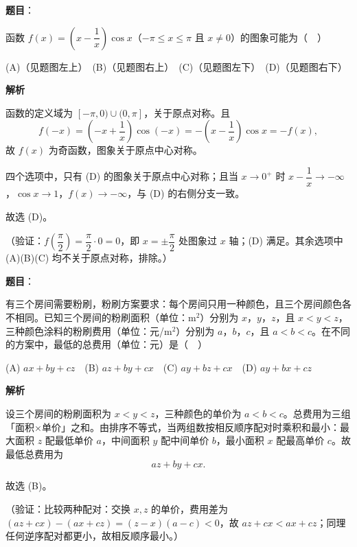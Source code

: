 \begin{answer}

\textbf{题目}：

函数 \(f(x)=\left(x-\dfrac{1}{x}\right)\cos x\)（\(-\pi\leqslant x\leqslant\pi\) 且 \(x\neq0\)）的图象可能为（　）
\nopagebreak[4]
\begin{center}\end{center}
\nopagebreak[4]
(A)（见题图左上）　(B)（见题图右上）　(C)（见题图左下）　(D)（见题图右下）

\textbf{解析}

函数的定义域为 \([-\pi,0)\cup(0,\pi]\)，关于原点对称。且
\nopagebreak[4]
\[
f(-x)=\left(-x+\frac1x\right)\cos(-x)
=-\left(x-\frac1x\right)\cos x=-f(x),
\]
故 \(f(x)\) 为奇函数，图象关于原点中心对称。

四个选项中，只有 (D) 的图象关于原点中心对称；且当 \(x\to0^+\) 时 \(x-\dfrac1x\to-\infty\)，\(\cos x\to1\)，\(f(x)\to-\infty\)，与 (D) 的右侧分支一致。

故选 (D)。

（验证：\(f\left(\dfrac{\pi}{2}\right)=\dfrac{\pi}{2}\cdot0=0\)，即 \(x=\pm\dfrac{\pi}{2}\) 处图象过 \(x\) 轴；(D) 满足。其余选项中 (A)(B)(C) 均不关于原点对称，排除。）


\end{answer}
\begin{answer}

\textbf{题目}：

有三个房间需要粉刷，粉刷方案要求：每个房间只用一种颜色，且三个房间颜色各不相同。已知三个房间的粉刷面积（单位：\(\mathrm{m}^2\)）分别为 \(x\)，\(y\)，\(z\)，且 \(x<y<z\)，三种颜色涂料的粉刷费用（单位：元/\(\mathrm{m}^2\)）分别为 \(a\)，\(b\)，\(c\)，且 \(a<b<c\)。在不同的方案中，最低的总费用（单位：元）是（　）

(A) \(ax+by+cz\)　(B) \(az+by+cx\)　(C) \(ay+bz+cx\)　(D) \(ay+bx+cz\)

\textbf{解析}

设三个房间的粉刷面积为 \(x<y<z\)，三种颜色的单价为 \(a<b<c\)。总费用为三组「面积×单价」之和。由排序不等式，当两组数按相反顺序配对时乘积和最小：最大面积 \(z\) 配最低单价 \(a\)，中间面积 \(y\) 配中间单价 \(b\)，最小面积 \(x\) 配最高单价 \(c\)。故最低总费用为
\nopagebreak[4]
\[
az+by+cx.
\]

故选 (B)。

（验证：比较两种配对：交换 \(x,z\) 的单价，费用差为 \((az+cx)-(ax+cz)=(z-x)(a-c)<0\)，故 \(az+cx<ax+cz\)；同理任何逆序配对都更小，故相反顺序最小。）


\end{answer}
